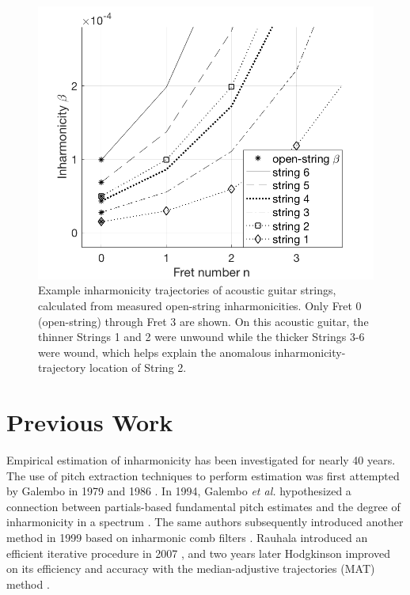 \documentclass[convention,peer-reviewed]{aesconf}
\begin{document}
\begin{figure}[t] 
\centering
\includegraphics[scale=0.25]{figs/beta-trajectories-ag}
\caption{Example inharmonicity trajectories of acoustic guitar strings, calculated from measured open-string inharmonicities. Only Fret 0 (open-string) through Fret 3 are shown. On this acoustic guitar, the thinner Strings 1 and 2 were unwound while the thicker Strings 3-6 were wound, which helps explain the anomalous inharmonicity-trajectory location of String 2.}
\label{fig:beta-trajectories-ag}
\end{figure}


\section{Previous Work}

Empirical estimation of inharmonicity has been investigated for nearly 40 years. The use of pitch extraction techniques to perform estimation was first attempted by Galembo in 1979 and 1986 \citep{galembo1979,galembo1987}. In 1994, Galembo \emph{et al.} hypothesized a connection between partials-based fundamental pitch estimates and the degree of inharmonicity in a spectrum \citep{galembo1994}. The same authors subsequently  introduced another method in 1999 based on inharmonic comb filters \citep{galembo1999}. Rauhala  introduced an efficient iterative procedure in 2007 \citep{rauhala2007}, and two years later Hodgkinson  improved on its efficiency and accuracy with the median-adjustive trajectories (MAT) method \citep{hodgkinson2009}.
\end{document}
